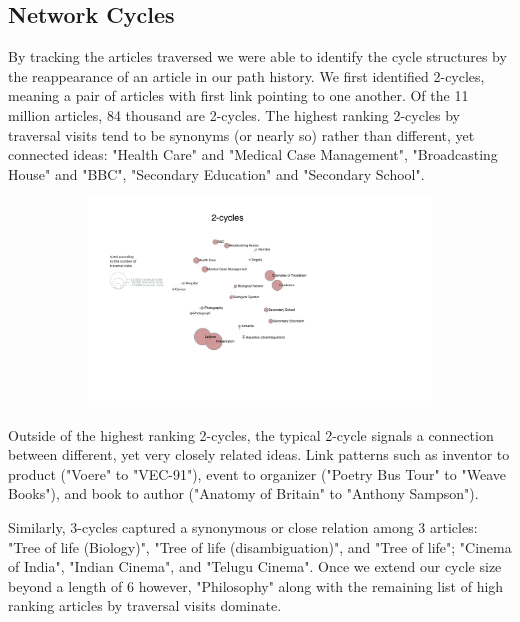\documentclass[twoside]{article}
\newcommand{\red}[1]{{\leavevmode\color{sred}{#1}}} %
\begin{document}
\subsection{Network Cycles}
By tracking the articles traversed we were able to identify the cycle structures
by the reappearance of an article in our path history.
We first identified 2-cycles, meaning a pair of articles with first link pointing to one another.
Of the 11 million articles, 84 thousand are 2-cycles. 
The highest ranking 2-cycles by traversal visits tend to be synonyms (or nearly so) rather than different, yet connected ideas:
"Health Care" and "Medical Case Management", "Broadcasting House" and "BBC", "Secondary Education" and "Secondary School".

\begin{figure}[H]
\centering
\caption{highest ranking 2-Cycles}
    \begin{subfigure}[b]{0.8\textwidth}
        \includegraphics[width=\textwidth]{graphics/2_cycles.pdf}
    \end{subfigure}
\end{figure}

\red{[[better representation to come\\
look into articles that don't seem to have a partner]]}


Outside of the highest ranking 2-cycles, the typical 2-cycle signals a connection between different, yet very closely related ideas. 
Link patterns such as inventor to product ("Voere" to "VEC-91"), event to organizer ("Poetry Bus Tour" to "Weave Books"), and book to author ("Anatomy of Britain" to "Anthony Sampson").

Similarly, 3-cycles captured a synonymous or close relation among 3 articles: "Tree of life (Biology)", "Tree of life (disambiguation)", 
and "Tree of life"; "Cinema of India", "Indian Cinema", and "Telugu Cinema". Once we extend our cycle size beyond a length of 6 however, 
"Philosophy" along with the remaining list of high ranking articles by traversal visits dominate.
\end{document}

